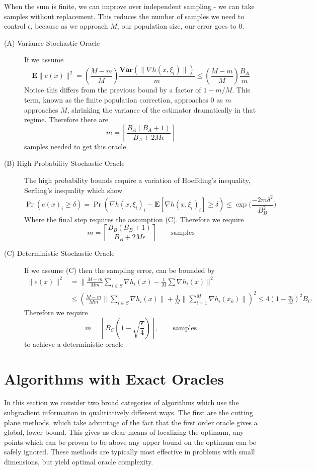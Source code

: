When the sum is finite, we can improve over independent sampling - we can take
samples without replacement. This reduces the number of samples we need to 
control $\epsilon$, because as we approach $M$, our population size, our error
goes to $0$.
\begin{description}
\item[(A) Variance Stochastic Oracle] If we assume  $$
\mathbf{E}\|e(x)\|^{2} = \left(\frac{M-m}{M}\right)\frac{\mathbf{Var}(\|\nabla h(x,\xi_{i})\|)}{m} \leq\left(\frac{M-m}{M}\right)\frac{B_A}{m} $$ Notice this
differs from the previous bound by a factor of $1 - m/M$. This term, known as
the finite population correction, approaches $0$ as $m$ approaches $M$, shrinking
the variance of the estimator dramatically in that regime. Therefore 
there are 
$$m= \left\lceil \frac{B_A(B_A+1)}{B_A+2M\epsilon} \right\rceil $$
samples needed to get this oracle.
\item[(B) High Probability Stochastic Oracle] The high probability bounds require
a variation of Hoeffding's inequality, Serfling's inequality which show
$$
\Pr\left(e(x)_i \geq\delta\right)=\Pr\left(\nabla h(x,\xi_{i})_i-\mathbf{E}[\nabla h(x,\xi_{i})_i] \geq\delta\right)\leq\exp\Big(\frac{-2m\delta^{2}}{B_B^{2}}\Big)
$$
Where the final step requires the assumption (C). Therefore we require
$$m=  \left\lceil \frac{B_B(B_B+1)}{B_B+2M\epsilon}  \right\rceil \qquad \mbox{samples}$$

\item[(C) Deterministic Stochastic Oracle] If we assume (C) then the
sampling error, can be bounded by
\begin{align*}
\|e(x)\|^{2} & =\Big\|\frac{M-m}{Mm}\sum_{i\in S}\nabla h_{i}(x)-\frac{1}{M}\sum\nabla h_{i}(x)\Big\|^{2}\\
 & \leq\left(\frac{M-m}{Mm}\Big\|\sum_{i\in S}\nabla h_{i}(x)\Big\|+\frac{1}{M}\Big\|\sum_{i=1}^{M}\nabla h_{i}(x_{k})\Big\|\right)^{2}\leq4\left(1-\frac{m}{M}\right)^{2}B_C
\end{align*}
Therefore we require
$$
m=\left\lceil B_C\left(1-\sqrt{\frac{\epsilon}{4}}\right)\right\rceil, \qquad \mbox{samples}
$$
to achieve a deterministic oracle
\end{description}


\section{Algorithms with Exact Oracles}

In this section we consider two broad categories of algorithms which use the
subgradient informaiton in qualitiatively different ways. The first are the
cutting plane methods, which take advantage of the fact that the first order
oracle gives a global, lower bound. This gives us clear means of localizing
the optimum, any points which can be proven to be above any upper bound on the
optimum can be safely ignored.  These methods are typically most effective in
problems with small dimensions,  but yield optimal oracle complexity.

